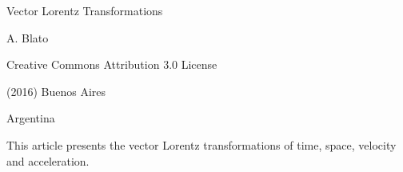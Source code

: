 \documentclass[10pt,fleqn]{article}
\begin{document}
\begin{center}

{\fontsize{10.92}{10.92}\selectfont \sc Vector Lorentz Transformations}

\bigskip \medskip

{\fontsize{9.60}{9.60}\selectfont A. Blato}

\bigskip \medskip

\small

Creative Commons Attribution 3.0 License

\smallskip

(2016) Buenos Aires

\medskip

Argentina

\smallskip

\bigskip \medskip

\parbox{84.00mm}{This article presents the vector Lorentz transformations of time, space, velocity and acceleration.}

\end{center}

\normalsize

\vspace{-1.20em}

\par {}

\bigskip \smallskip
\end{document}
